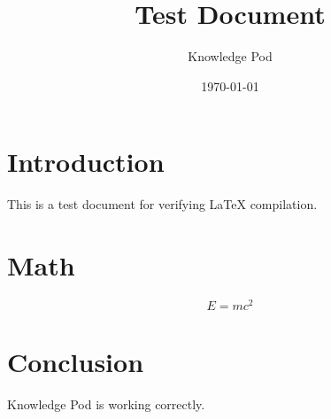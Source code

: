 \documentclass{article}
\title{Test Document}
\author{Knowledge Pod}
\date{\today}
\begin{document}
\maketitle

\section{Introduction}
This is a test document for verifying LaTeX compilation.

\section{Math}
\begin{equation}
  E = mc^2
\end{equation}

\section{Conclusion}
Knowledge Pod is working correctly.
\end{document}
